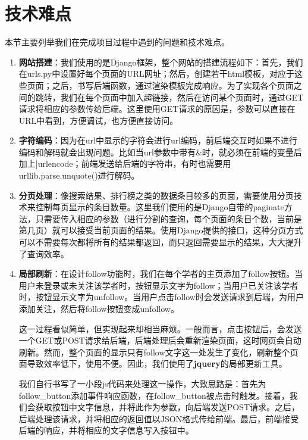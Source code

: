 
\section{技术难点}

本节主要列举我们在完成项目过程中遇到的问题和技术难点。

\begin{enumerate}
\item {\bf 网站搭建}：我们使用的是Django框架，整个网站的搭建流程如下：首先，我们在urls.py中设置好每个页面的URL网址；然后，创建若干html模板，对应于这些页面；之后，书写后端函数，通过渲染模板完成响应。为了实现各个页面之间的跳转，我们在每个页面中加入超链接，然后在访问某个页面时，通过GET请求将相应的参数传给后端。这里使用GET请求的原因是，参数可以直接在URL中看到，方便调试，也方便直接访问。

\item {\bf 字符编码}：因为在url中显示的字符会进行url编码，前后端交互时如果不进行编码和解码就会出现问题。比如当url参数中带有\&时，就必须在前端的变量后加上|urlencode；前端发送给后端的字符串，有时也需要用urllib.parse.unquote()进行解码。

\item {\bf 分页处理}：像搜索结果、排行榜之类的数据条目较多的页面，需要使用分页技术来控制每页显示的条目数量。这里我们使用的是Django自带的paginate方法，只需要传入相应的参数（进行分割的查询，每个页面的条目个数，当前是第几页）就可以接受当前页面的结果。使用Django提供的接口，这种分页方式可以不需要每次都将所有的结果都返回，而只返回需要显示的结果，大大提升了查询效率。

\item {\bf 局部刷新}：在设计follow功能时，我们在每个学者的主页添加了follow按钮。当用户未登录或未关注该学者时，按钮显示文字为follow；当用户已关注该学者时，按钮显示文字为unfollow。当用户点击follow时会发送请求到后端，为用户添加关注，然后将follow按钮变成unfollow。

这一过程看似简单，但实现起来却相当麻烦。一般而言，点击按钮后，会发送一个GET或POST请求给后端，后端处理后会重新渲染页面，这时网页会自动刷新。然而，整个页面的显示只有follow文字这一处发生了变化，刷新整个页面导致效率低下，使用不便。因此，我们使用了{\bf jquery}的局部更新工具。

我们自行书写了一小段js代码来处理这一操作，大致思路是：首先为follow\_button添加事件响应函数，在follow\_button被点击时触发。接着，我们会获取按钮中文字信息，并将此作为参数，向后端发送POST请求。之后，后端处理该请求，并将相应的返回值以JSON格式传给前端。最后，前端接受后端的响应，并将相应的文字信息写入按钮中。


\end{enumerate}
